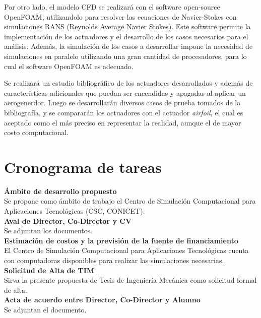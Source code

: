 \documentclass{article}
\numberwithin{equation}{subsection}
\begin{document}
Por otro lado, el modelo CFD se realizará con el software open-source OpenFOAM, utilizandolo para resolver las ecuaciones de Navier-Stokes con simulaciones RANS (Reynolds Average Navier Stokes). Este software permite la implementación de los actuadores y el desarrollo de los casos necesarios para el análisis. Además, la simulación de los casos a desarrollar impone la necesidad de simulaciones en paralelo utilizando una gran cantidad de procesadores, para lo cual el software OpenFOAM es adecuado.

Se realizará un estudio bibliográfico de los actuadores desarrollados y además de características adicionales que puedan ser encendidas y apagadas al aplicar un aerogenerdor. Luego se desarrollarán diversos casos de prueba tomados de la bibliografía, y se compararán los actuadores con el actuador \textit{airfoil}, el cual es aceptado como el más preciso en representar la realidad, aunque el de mayor costo computacional.

\section{Cronograma de tareas}


\newpage
\nocite{*}
\printbibliography

\newpage
\noindent \textbf{Ámbito de desarrollo propuesto}\\
\indent Se propone como ámbito de trabajo el Centro de Simulación Computacional para Aplicaciones Tecnológicas (CSC, CONICET).\\

\noindent  \textbf{Aval de Director, Co-Director y CV}\\
\indent Se adjuntan los documentos.\\

\noindent \textbf{Estimación de costos y la previsión de la fuente de financiamiento}\\
\indent El Centro de Simulación Computacional para Aplicaciones Tecnológicas cuenta con computadoras disponibles para realizar las simulaciones necesarias.\\

\noindent \textbf{Solicitud de Alta de TIM}\\
\indent Sirva la presente propuesta de Tesis de Ingeniería Mecánica como solicitud formal de alta.\\

\noindent  \textbf{Acta de acuerdo entre Director, Co-Director y Alumno}\\
\indent Se adjuntan el documento.\\
\end{document}
